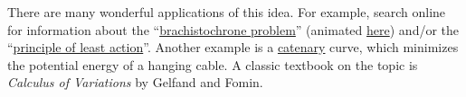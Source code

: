 There are many wonderful applications of this idea.  For example, search online for information about the ``\href{https://mathworld.wolfram.com/BrachistochroneProblem.html}{brachistochrone problem}'' (animated \href{https://en.wikipedia.org/wiki/Brachistochrone_curve}{here}) and/or the ``\href{https://en.wikipedia.org/wiki/Stationary-action_principle}{principle of least action}''.  Another example is a \href{https://en.wikipedia.org/wiki/Catenary}{catenary} curve, which minimizes the potential energy of a hanging cable.  A classic textbook on the topic is {\it Calculus of Variations} by Gelfand and Fomin.
